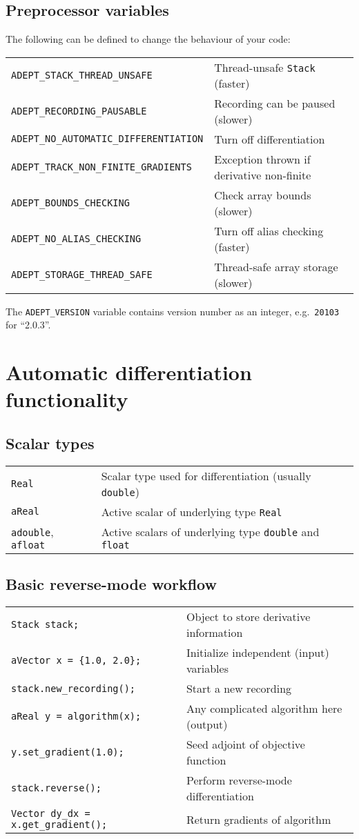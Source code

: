\documentclass[10pt,a4,landscape]{article}
\def\code#1{\texttt{#1}}
\begin{document}
\subsection*{Preprocessor variables}
The following can be defined to change the behaviour of your code:\\
\begin{tabular}{ll}
\code{ADEPT\_STACK\_THREAD\_UNSAFE} & Thread-unsafe \code{Stack} (faster)\\
\code{ADEPT\_RECORDING\_PAUSABLE} & Recording can be paused (slower)\\
\code{ADEPT\_NO\_AUTOMATIC\_DIFFERENTIATION} & Turn off differentiation\\
\code{ADEPT\_TRACK\_NON\_FINITE\_GRADIENTS} & Exception thrown if derivative non-finite\\
\code{ADEPT\_BOUNDS\_CHECKING} & Check array bounds (slower)\\
\code{ADEPT\_NO\_ALIAS\_CHECKING} & Turn off alias checking (faster)\\
\code{ADEPT\_STORAGE\_THREAD\_SAFE} & Thread-safe array storage (slower)\\
\end{tabular}

The \code{ADEPT\_VERSION} variable contains version number as an
integer, e.g.\ \code{20103} for ``2.0.3''.
\section*{Automatic differentiation functionality}
\subsection*{Scalar types}
\begin{tabular}{ll}
\code{Real} & Scalar type used for differentiation (usually
\code{double})\\
\code{aReal} & Active scalar of underlying type \code{Real} \\
\code{adouble}, \code{afloat} & Active scalars of underlying type
\code{double} and \code{float}\\
\end{tabular}
\subsection*{Basic reverse-mode workflow}
\begin{tabular}{ll}
\code{Stack stack;} & Object to store derivative information\\
\code{aVector x = \{1.0, 2.0\};} & Initialize independent (input) variables\\
\code{stack.new\_recording();} & Start a new recording\\
\code{aReal y = algorithm(x);} & Any complicated algorithm here (output)\\
\code{y.set\_gradient(1.0);} & Seed adjoint of objective function\\
\code{stack.reverse();} & Perform reverse-mode differentiation\\
\code{Vector dy\_dx = x.get\_gradient();} & Return gradients of algorithm\\
\end{tabular}
\end{document}
